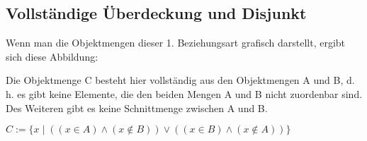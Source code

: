       \subsection{Vollständige Überdeckung und Disjunkt}
        \label{complette_disjunkt}
        Wenn man die Objektmengen dieser 1. Beziehungsart grafisch darstellt,
        ergibt sich diese Abbildung:

        \begin{center}
        \end{center}
        Die Objektmenge C besteht hier vollständig aus den Objektmengen A und
        B, d. h. es gibt keine Elemente, die den beiden Mengen A und B nicht
        zuordenbar sind. Des Weiteren gibt es keine Schnittmenge zwischen A und
        B.

        $C := \{x \mid ((x \in A) \wedge (x \notin B)) \vee ((x \in B) \wedge (x \notin A))\}$

